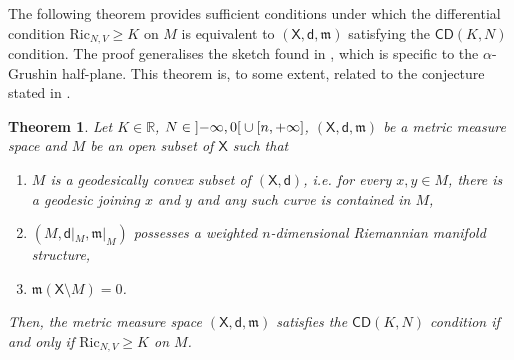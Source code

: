 \documentclass[11pt,twoside,a4paper]{article}
\newcommand{\red}{\color{red}}
\newcommand{\R}{\mathbb{R}}
\newcommand{\cd}{\mathsf{CD}}
\newcommand{\Ric}{\mathrm{Ric}}
\newcommand{\X}{\mathsf{X}}
\newcommand{\di}
{\mathsf d} %
\theoremstyle{theorem}
\newtheorem{theorem}{Theorem}[section]
\theoremstyle{definition}
\theoremstyle{remark}
\theoremstyle{proof}
\begin{document}
The following theorem provides sufficient conditions under which the differential condition $\Ric_{N,V} \geq K$ on $M$ is equivalent to $(\X, \di, \mathfrak{m})$ satisfying the $\mathsf{CD}(K, N)$ condition. The proof generalises the sketch found in \cite[Section 3.5]{rizzi2023failure}, which is specific to the $\alpha$-Grushin half-plane. This theorem is, to some extent, related to the conjecture stated in \cite{han2020}.
\begin{theorem}
    \label{theorem:equivalence}
    Let $K \in \R$, $N \in \ointerval{-\infty}{0} \cup \interval{n}{+\infty}$, $(\X, \di, \mathfrak{m})$ be a metric measure space and $M$ be an open subset of $\X$ such that
	\begin{enumerate}[label=\normalfont(\roman*)]
	\item $M$ is a geodesically convex
    subset of $(\X, \di)$, i.e. for every $x,y\in M$, there is a geodesic joining $x$ and $y$ and any such curve is contained in $M$,
	\item $(M, \di|_M, \mathfrak{m}|_M)$ possesses a weighted $n$-dimensional Riemannian manifold structure,
	\item $\mathfrak{m}(\X \setminus M) = 0$.
	\end{enumerate}
	Then, the metric measure space $(\X, \di, \mathfrak{m})$ satisfies the $\cd(K,N)$ condition if and only if $\mathrm{Ric}_{N,V} \geq K$ on $M$.
\end{theorem}
\end{document}
